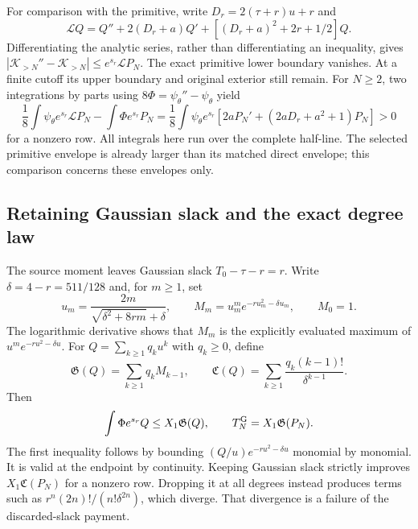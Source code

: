 \documentclass[11pt]{article}
\numberwithin{equation}{section}
\begin{document}
For comparison with the primitive, write $D_r=2(\tau+r)u+r$ and
\[
 \mathscr L Q=Q''+2(D_r+a)Q'
                 +[(D_r+a)^2+2r+1/2]Q.
\]
Differentiating the analytic series, rather than differentiating an
inequality, gives $|\mathscr K_{>N}''-\mathscr K_{>N}|
\le e^{s_r}\mathscr LP_N$. The exact primitive lower boundary
vanishes. At a finite cutoff its upper boundary and original exterior
still remain. For $N\ge2$, two integrations by parts using
$8\Phi=\psi_\theta''-\psi_\theta$ yield
\begin{equation}\label{fcg:primitiveenvelopegap}
 \frac18\int\psi_\theta e^{s_r}\mathscr LP_N
 -\int\Phi e^{s_r}P_N
 =\frac18\int\psi_\theta e^{s_r}
       [2aP_N'+(2aD_r+a^2+1)P_N]>0
\end{equation}
for a nonzero row. All integrals here run over the complete half-line.
The selected primitive envelope is already larger than its matched
direct envelope; this comparison concerns these envelopes only.

\subsection{Retaining Gaussian slack and the exact degree law}

The source moment leaves Gaussian slack
$T_0-\tau-r=r$. Write $\delta=4-r=511/128$ and, for $m\ge1$, set
\[
 u_m=\frac{2m}{\sqrt{\delta^2+8rm}+\delta},\qquad
 M_m=u_m^m e^{-ru_m^2-\delta u_m},\qquad M_0=1.
\]
The logarithmic derivative shows that $M_m$ is the explicitly
evaluated maximum of $u^me^{-ru^2-\delta u}$. For
$Q=\sum_{k\ge1}q_ku^k$ with $q_k\ge0$, define
\[
 \mathfrak G(Q)=\sum_{k\ge1}q_kM_{k-1},\qquad
 \mathfrak C(Q)=\sum_{k\ge1}\frac{q_k(k-1)!}{\delta^{k-1}}.
\]
Then
\begin{equation}\label{fcg:gaussianslackpayment}
 \int\Phi e^{s_r}Q\le X_1\mathfrak G(Q),\qquad
 T_N^{\rm G}=X_1\mathfrak G(P_N).
\end{equation}
The first inequality follows by bounding
$(Q/u)e^{-ru^2-\delta u}$ monomial by monomial. It is valid at the
endpoint by continuity. Keeping Gaussian slack strictly improves
$X_1\mathfrak C(P_N)$ for a nonzero row. Dropping it at all degrees
instead produces terms such as $r^n(2n)!/(n!\delta^{2n})$, which
diverge. That divergence is a failure of the discarded-slack payment.
\end{document}
